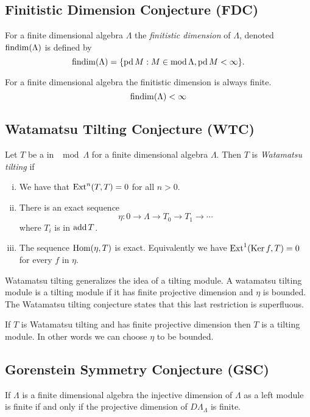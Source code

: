 
\subsection*{Finitistic Dimension Conjecture (FDC)}
\begin{defn}
	For a finite dimensional algebra $\Lambda$ the \emph{finitistic dimension} of $\Lambda$, denoted $\operatorname{findim}(\Lambda)$ is defined by
	$$\operatorname{findim}(\Lambda) = \{\operatorname{pd} M : M \in \operatorname{mod}\Lambda, \operatorname{pd} M < \infty\}.$$
\end{defn}

\begin{conj}
	For a finite dimensional algebra the finitistic dimension is always finite.
	$$\operatorname{findim}(\Lambda) < \infty$$
\end{conj}

\subsection*{Watamatsu Tilting Conjecture (WTC)}
\begin{defn}
	Let $T$ be a in $\mod\Lambda$ for a finite dimensional algebra $\Lambda$. Then $T$ is \emph{Watamatsu tilting} if
	\begin{enumerate}[i)]
		\item We have that $\operatorname{Ext}^n(T,T)=0$ for all $n >0$.
		\item There is an exact sequence 
		$$\eta\colon 0 \to \Lambda \to T_0 \to T_1 \to \cdots$$ where $T_i$ is in $\operatorname{add} T$.
		\item The sequence $\operatorname{Hom}(\eta, T)$ is exact. Equivalently we have $\operatorname{Ext}^1(\operatorname{Ker} f, T)=0$ for every $f$ in $\eta$.
	\end{enumerate}
\end{defn}

Watamatsu tilting generalizes the idea of a tilting module. A watamatsu tilting module is a tilting module if it has finite projective dimension and $\eta$ is bounded. The Watamatsu tilting conjecture states that this last restriction is superfluous.

\begin{conj} 
	If $T$ is Watamatsu tilting and has finite projective dimension then $T$ is a tilting module. In other words we can choose $\eta$ to be bounded.
\end{conj}

\subsection*{Gorenstein Symmetry Conjecture (GSC)}
\begin{conj} 
	If $\Lambda$ is a finite dimensional algebra the injective dimension of $\Lambda$ as a left module is finite if and only if the projective dimension of $D\Lambda_\Lambda$ is finite.
\end{conj}

